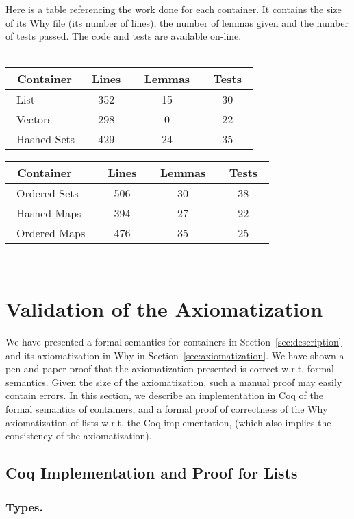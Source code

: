 \documentclass[runningheads,a4paper]{llncs}
\newcommand{\wrt}{w.r.t.\xspace}
\newcommand{\beforesec}{\vspace{-0.2cm}}
\newcommand{\aftersec}{\vspace{-0.2cm}}
\newcommand{\beforesub}{\vspace{-0.2cm}}
\newcommand{\aftersub}{\vspace{-0.1cm}}
\begin{document}
Here is a table referencing the work done for each container. It contains the
size of its Why file (its number of lines), the number of lemmas given and the
number of tests passed. The code and tests are available
on-line.\\
~\\
\begin{tabular}{|l|c|c|c||}
\hline
~Container & ~Lines~ & ~Lemmas~ & ~Tests~ \\
\hline
~List & 352 & 15 & 30 \\
\hline
~Vectors & 298 & 0 & 22 \\
\hline
~Hashed Sets & 429 & 24 & 35 \\
\hline
\end{tabular}\begin{tabular}{|l|c|c|c|}
\hline
~Container & ~Lines~ & ~Lemmas~ & ~Tests~ \\
\hline
~Ordered Sets & 506 & 30 & 38 \\
\hline
~Hashed Maps & 394 & 27 & 22 \\
\hline
~Ordered Maps~ & 476 & 35 & 25 \\
\hline
\end{tabular}\\

\beforesec
\section{Validation of the Axiomatization}
\label{sec:validation}
\aftersec

We have presented a formal semantics for containers in
Section~\ref{sec:description} and its axiomatization in Why in
Section~\ref{sec:axiomatization}. We have shown a pen-and-paper proof that the
axiomatization presented is correct \wrt formal semantics. Given the size of
the axiomatization, such a manual proof may easily contain errors. In this
section, we describe an implementation in Coq of the formal semantics of
containers, and a formal proof of correctness of the Why axiomatization of
lists \wrt the Coq implementation, (which also implies
the consistency of the axiomatization).

\beforesub
\subsection{Coq Implementation and Proof for Lists}
\aftersub

\subsubsection{Types.}
\end{document}
